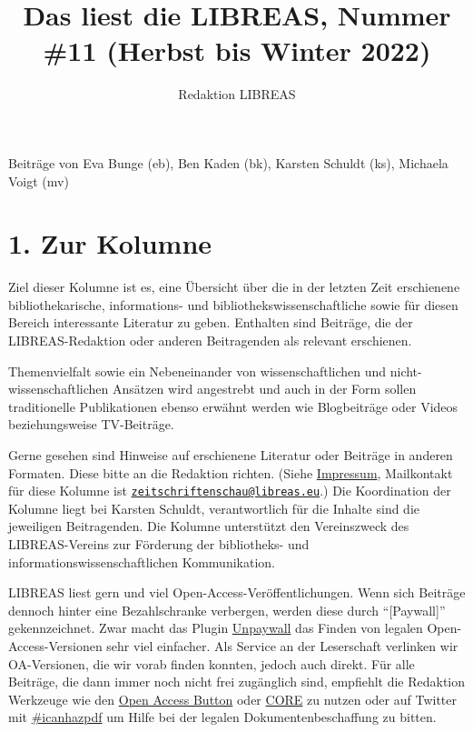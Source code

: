 \documentclass[a4paper,
fontsize=11pt,
oneside,
numbers=noperiodatend,
parskip=half-,
bibliography=totoc,
final
]{scrartcl}
\title{\LARGE{Das liest die LIBREAS, Nummer \#11 (Herbst bis Winter 2022)}}%
\author{Redaktion LIBREAS} %
\date{}
\begin{document}
\maketitle
\thispagestyle{fancyplain} 


Beiträge von Eva Bunge (eb), Ben Kaden (bk), Karsten Schuldt (ks),
Michaela Voigt (mv)

\hypertarget{zur-kolumne}{%
\section{1. Zur Kolumne}\label{zur-kolumne}}

Ziel dieser Kolumne ist es, eine Übersicht über die in der letzten Zeit
erschienene bibliothekarische, informations- und
bibliothekswissenschaftliche sowie für diesen Bereich interessante
Literatur zu geben. Enthalten sind Beiträge, die der LIBREAS-Redaktion
oder anderen Beitragenden als relevant erschienen.

Themenvielfalt sowie ein Nebeneinander von wissenschaftlichen und
nicht-wissenschaftlichen Ansätzen wird angestrebt und auch in der Form
sollen traditionelle Publikationen ebenso erwähnt werden wie
Blogbeiträge oder Videos beziehungsweise TV-Beiträge.

Gerne gesehen sind Hinweise auf erschienene Literatur oder Beiträge in
anderen Formaten. Diese bitte an die Redaktion richten. (Siehe
\href{http://libreas.eu/about/}{Impressum}, Mailkontakt für diese
Kolumne ist
\href{mailto:zeitschriftenschau@libreas.eu}{\nolinkurl{zeitschriftenschau@libreas.eu}}.)
Die Koordination der Kolumne liegt bei Karsten Schuldt, verantwortlich
für die Inhalte sind die jeweiligen Beitragenden. Die Kolumne
unterstützt den Vereinszweck des LIBREAS-Vereins zur Förderung der
bibliotheks- und informationswissenschaftlichen Kommunikation.

LIBREAS liest gern und viel Open-Access-Veröffentlichungen. Wenn sich
Beiträge dennoch hinter eine Bezahlschranke verbergen, werden diese
durch \enquote{{[}Paywall{]}} gekennzeichnet. Zwar macht das Plugin
\href{http://unpaywall.org/}{Unpaywall} das Finden von legalen
Open-Access-Versionen sehr viel einfacher. Als Service an der
Leserschaft verlinken wir OA-Versionen, die wir vorab finden konnten,
jedoch auch direkt. Für alle Beiträge, die dann immer noch nicht frei
zugänglich sind, empfiehlt die Redaktion Werkzeuge wie den
\href{https://openaccessbutton.org/}{Open Access Button} oder
\href{https://core.ac.uk/services/discovery/}{CORE} zu nutzen oder auf
Twitter mit
\href{https://twitter.com/hashtag/icanhazpdf?src=hash}{\#icanhazpdf} um
Hilfe bei der legalen Dokumentenbeschaffung zu bitten.
\end{document}
